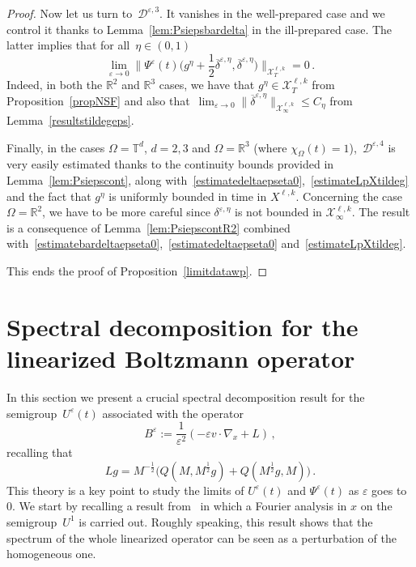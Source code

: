 \documentclass[11pt]{article}
\theoremstyle{definition}
\numberwithin{equation}{section}
\numberwithin{figure}{section}
\numberwithin{table}{section}
\newcommand*\R {\mathbb{R}}
\newcommand*\T {\mathbb{T}}
\newcommand*\eps{{\varepsilon}}
\newcommand*\e{{\varepsilon}}
\begin{document}
\begin{proof}


Now let us turn to~$ {\mathcal D} ^{\eps,3}$. It vanishes in the well-prepared case and we control it thanks to Lemma~\ref{lem:Psiepsbardelta} in the ill-prepared case. The latter implies that for all~$\eta\in(0,1)$
\[
\lim_{\eps\to 0} \Big\|\Psi^\eps(t)\Big(g^\eta + \frac{1}{2} \overline\delta^{\eps,\eta},\overline\delta^{\eps,\eta}\Big)\Big\|_{\mathcal{X}^{\ell,k}_{T}} =0 \,.
\]
Indeed, in both the $\R^2$ and $\R^3$ cases, we have that $g^\eta \in \mathcal{X}^{\ell,k}_T$ from Proposition~\ref{propNSF} and also that~$\lim_{\e\to0} \|\overline\delta^{\eps,\eta}\|_{\mathcal{X}^{\ell,k}_\infty} \le C_\eta$ from Lemma~\ref{resultstildegeps}.

Finally, in the cases $\Omega=\T^d$, $d=2,3$ and $\Omega=\R^3$ (where $\chi_\Omega(t)=1$),~$ {\mathcal D} ^{\eps,4}$ is very easily estimated thanks to the continuity bounds provided in Lemma~\ref{lem:Psiepscont}, along with~\eqref{estimatedeltaepseta0},~\eqref{estimateLpXtildeg} and the fact that $g^\eta$ is uniformly bounded in time in $X^{\ell,k}$. Concerning the case $\Omega=\R^2$, we have to be more careful since $\delta^{\eps,\eta}$ is not bounded in $\mathcal{X}^{\ell,k}_\infty$. The result is a consequence of Lemma~\ref{lem:PsiepscontR2} combined with~\eqref{estimatebardeltaepseta0},~\eqref{estimatedeltaepseta0} and~\eqref{estimateLpXtildeg}.


This ends the proof of Proposition~\ref{limitdatawp}. 
\end{proof}%

\appendix
\section{Spectral decomposition for the linearized Boltzmann operator}\label{specBoltz}
In this section we present a crucial spectral decomposition result for the semigroup~$ U^\e(t)$ associated with the operator
\[
B^\e:=\frac{1}{\e^2}(-\e v \cdot \nabla_x +L)\,,
\]
recalling that
\[
Lg =M^{-\frac12}\big(
Q(M,M^\frac12 g) + Q(M^\frac12 g,M)\big)\,.
\]
This theory is a key point to study the limits of $U^\eps(t)$ and $\Psi^\eps(t)$ as $\eps$ goes to~$0$.
We start by recalling a result from~\cite{Ellis-Pinsky} in which a Fourier analysis in $x$ on the semigroup~$U^1$ is carried out. Roughly speaking, this result shows that the spectrum of the whole linearized operator can be seen as a perturbation of the homogeneous one.
\end{document}
